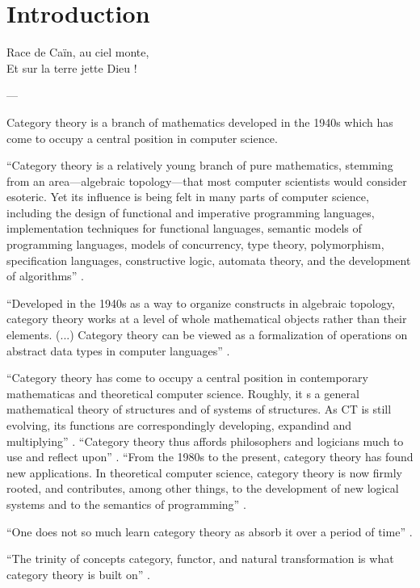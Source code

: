 \chapter{Introduction}

\epigraph{
  Race de Caïn, au ciel monte,\\
  Et sur la terre jette Dieu !
}{---\textcite[16]{baudelaire-1857}}


Category theory is a branch of mathematics developed in the 1940s
which has come to occupy a central position in computer science.


``Category theory is a relatively young branch of pure mathematics,
stemming from an area---algebraic topology---that most computer
scientists would consider esoteric. Yet its influence is being felt in
many parts of computer science, including the design of functional and
imperative programming languages, implementation techniques for
functional languages, semantic models of programming languages, models
of concurrency, type theory, polymorphism, specification languages,
constructive logic, automata theory, and the development of
algorithms'' \parencite[xi]{pierce-1991}.


``Developed in the 1940s as a way to organize constructs in algebraic
topology, category theory works at a level of whole mathematical
objects rather than their elements. (...) Category theory can be
viewed as a formalization of operations on abstract data types in
computer languages'' \parencite[1154]{wolfram-2002}.

``Category theory has come to occupy a central position in
contemporary mathematicas and theoretical computer science. Roughly,
it s a general mathematical theory of structures and of systems of
structures. As CT is still evolving, its functions are correspondingly
developing, expandind and multiplying'' \parencite[1]{marquis-2013}.
``Category theory thus affords philosophers and logicians much to use
and reflect upon'' \parencite[1]{marquis-2013}. ``From the 1980s to
the present, category theory has found new applications. In
theoretical computer science, category theory is now firmly rooted,
and contributes, among other things, to the development of new logical
systems and to the semantics of programming''
\parencite[23]{marquis-2013}.

``One does not so much learn category theory as absorb it over a
period of time'' \parencite[26]{bird-demoor-1997}.

``The trinity of concepts category, functor, and natural
transformation is what category theory is built on''
\parencite{nlab-category-theory}.





